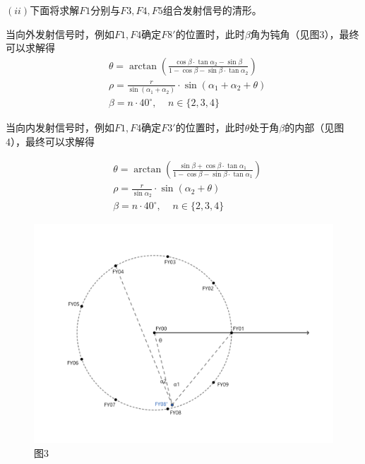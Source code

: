 \documentclass{ctexart}
\def\al{\alpha}
\def\b{\beta}
\def\t{\theta}
\def\c{\circ}
\begin{document}
\vspace{0.5em}	
	$(ii)$下面将求解$F1$分别与$F3,F4,F5$组合发射信号的清形。
	\par
	当向外发射信号时，例如$F1,F4$确定$F8'$的位置时，此时$\beta$角为钝角（见图3），最终可以求解得
\begin{equation}
	\begin{aligned}
		&\t=\arctan( \frac{\cos\b \cdot \tan\al_2-\sin\b}{1-\cos\b-\sin\b \cdot \tan\al_2}  )\\
		&\rho=\frac{r}{\sin(\alpha_1 + \alpha_2)}\cdot \sin(\alpha_1+\alpha_2+\theta)\\
		&\b=n\cdot 40^\c,  \;\;\;\;n\in\{2,3,4\}
	\end{aligned}
\end{equation}

\vspace{1em}
	当向内发射信号时，例如$F1,F4$确定$F3'$的位置时，此时$\t$处于角$\b$的内部（见图4），最终可以求解得

\begin{equation}
	\begin{aligned}
		&\t = \arctan ( \frac{\sin\b+\cos\b\cdot \tan\al_1}{1-\cos\b-\sin\b\cdot \tan\al_1} )\\
		&\rho= \frac{r}{\sin\al_2}\cdot \sin(\al_2 +\t)\\
		&\b=n\cdot 40^\c,  \;\;\;\;n\in\{2,3,4\}
	\end{aligned}
\end{equation}

\begin{figure}[htbp]
	\centering
	\includegraphics[scale=0.4]{pic/3.jpg}
	\caption*{图3}
\end{figure}
\end{document}
